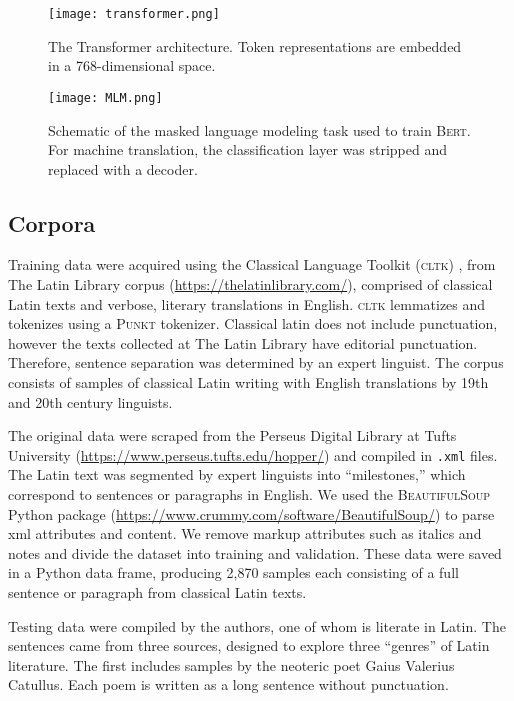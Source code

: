 \documentclass[11pt,a4paper]{article}
\begin{document}
\begin{figure}
    \centering
    \texttt{[image: transformer.png]}
    \caption{The Transformer architecture.
    Token representations are embedded in a 768-dimensional space.}
    \label{fig:transformer}
\end{figure}

\begin{figure}
    \centering
    \texttt{[image: MLM.png]}
    \caption{Schematic of the masked language modeling task
    used to train \textsc{Bert}.
    For machine translation, the classification layer was stripped
    and replaced with a decoder.}
    \label{fig:MLM}
\end{figure}

\subsection{Corpora}

Training data were acquired using the Classical Language Toolkit (\textsc{cltk}) \citep{johnson2014}, from The Latin Library corpus (\href{https://thelatinlibrary.com/}{https://thelatinlibrary.com/}),
comprised of classical Latin texts and verbose, literary translations in English.
\textsc{cltk} lemmatizes and tokenizes using a \textsc{Punkt} tokenizer.
Classical latin does not include punctuation,
however the texts collected at The Latin Library have editorial punctuation.
Therefore, sentence separation was determined by an expert linguist.
The corpus consists of samples of classical Latin writing
with English translations by 19th and 20th century linguists.

The original data were scraped from the Perseus Digital Library at Tufts University
(\href{https://www.perseus.tufts.edu/hopper/}{https://www.perseus.tufts.edu/hopper/})
and compiled in \texttt{.xml} files.
The Latin text was segmented by expert linguists into ``milestones,''
which correspond to sentences or paragraphs in English.
We used the \textsc{BeautifulSoup} Python package
(\href{https://www.crummy.com/software/BeautifulSoup/}{https://www.crummy.com/software/BeautifulSoup/})
to parse xml attributes and content.
We remove markup attributes such as italics and notes
and divide the dataset into training and validation.
These data were saved in a Python data frame,
producing 2,870 samples each consisting of a full sentence or paragraph
from classical Latin texts.

Testing data were compiled by the authors,
one of whom is literate in Latin.
The sentences came from three sources, designed to explore three ``genres'' of Latin literature.
The first includes samples by the neoteric poet Gaius Valerius Catullus.
Each poem is written as a long sentence without punctuation.
\end{document}
